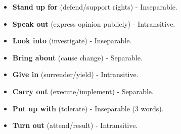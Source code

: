 \documentclass[11pt]{article}
\begin{document}
\begin{methode}
    \begin{itemize}
        \item \textbf{Stand up for} (defend/support rights) - Inseparable.
        \item \textbf{Speak out} (express opinion publicly) - Intransitive.
        \item \textbf{Look into} (investigate) - Inseparable.
        \item \textbf{Bring about} (cause change) - Separable.
        \item \textbf{Give in} (surrender/yield) - Intransitive.
        \item \textbf{Carry out} (execute/implement) - Separable.
        \item \textbf{Put up with} (tolerate) - Inseparable (3 words).
        \item \textbf{Turn out} (attend/result) - Intransitive.
    \end{itemize}
\end{methode}
\end{document}
